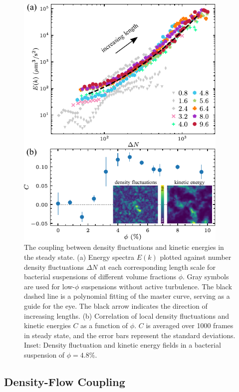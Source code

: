 \begin{figure}[!ht]
\begin{center}
\includegraphics[width=4in]{figs/5-GNF/6.pdf}
\caption[The coupling between GNF and kinetic energy spectra]
{
The coupling between density fluctuations and kinetic energies in the steady state.
(a) Energy spectra $E(k)$ plotted against number density fluctuations $\Delta N$ at each corresponding length scale for bacterial suspensions of different volume fractions $\phi$. Gray symbols are used for low-$\phi$ suspensions without active turbulence. The black dashed line is a polynomial fitting of the master curve, serving as a guide for the eye. The black arrow indicates the direction of increasing lengths.
(b) Correlation of local density fluctuations and kinetic energies $C$ as a function of $\phi$. $C$ is averaged over 1000 frames in steady state, and the error bars represent the standard deviations. Inset: Density fluctuation and kinetic energy fields in a bacterial suspension of $\phi = 4.8\%$.
}
\label{fig:GNF-energy-spectra-correlation}
\end{center}
\end{figure}


\subsection{Density-Flow Coupling}

